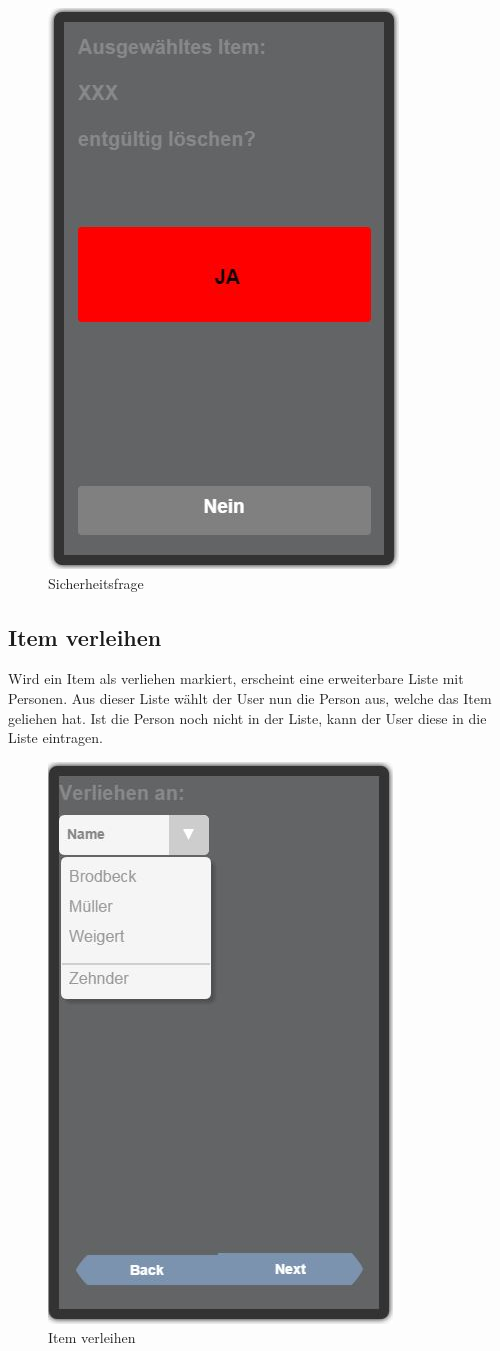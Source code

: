 \begin{figure}[htbp]
	\centering
	\includegraphics[scale=0.5]{pic/GUI/DeleteItem}
	\caption{Sicherheitsfrage}
	\end{figure}
	
\subsection{Item verleihen}

Wird ein Item als verliehen markiert, erscheint eine erweiterbare Liste mit Personen. Aus dieser Liste wählt der User nun die Person aus, welche das Item geliehen hat. Ist die Person noch nicht in der Liste, kann der User diese in die Liste eintragen.

\begin{figure}[htbp]
	\centering
	\includegraphics[scale=0.5]{pic/GUI/VerliehenAn}
	\caption{Item verleihen}
\end{figure}